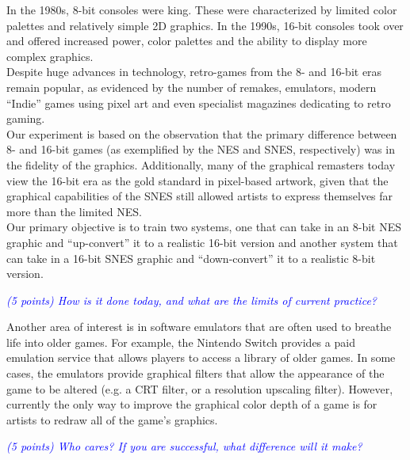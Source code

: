 \documentclass[10pt,twocolumn,letterpaper]{article}
\begin{document}
In the 1980s, 8-bit consoles were king. These were characterized by limited color palettes and relatively simple 2D graphics. In the 1990s, 16-bit consoles took over and offered increased power, color palettes and the ability to display more complex graphics.\\
Despite huge advances in technology, retro-games from the 8- and 16-bit eras remain popular, as evidenced by the number of remakes, emulators, modern ``Indie'' games using pixel art and even specialist magazines dedicating to retro gaming.\\
Our experiment is based on the observation that the primary difference between 8- and 16-bit games (as exemplified by the NES and SNES, respectively) was in the fidelity of the graphics. Additionally, many of the graphical remasters today view the 16-bit era as the gold standard in pixel-based artwork, given that the graphical capabilities of the SNES still allowed artists to express themselves far more than the limited NES.\\
Our primary objective is to train two systems, one that can take in an 8-bit NES graphic and ``up-convert'' it to a realistic 16-bit version and another system that can take in a 16-bit SNES graphic and ``down-convert'' it to a realistic 8-bit version.

\textit{\textcolor{blue}{(5 points) How is it done today, and what are the limits of current practice?}}

Another area of interest is in software emulators that are often used to breathe life into older games. For example, the Nintendo Switch provides a paid emulation service that allows players to access a library of older games. In some cases, the emulators provide graphical filters that allow the appearance of the game to be altered (e.g. a CRT filter, or a resolution upscaling filter). However, currently the only way to improve the graphical color depth of a game is for artists to redraw all of the game's graphics.

\textit{\textcolor{blue}{(5 points) Who cares? If you are successful, what difference will it make?}}
\end{document}

